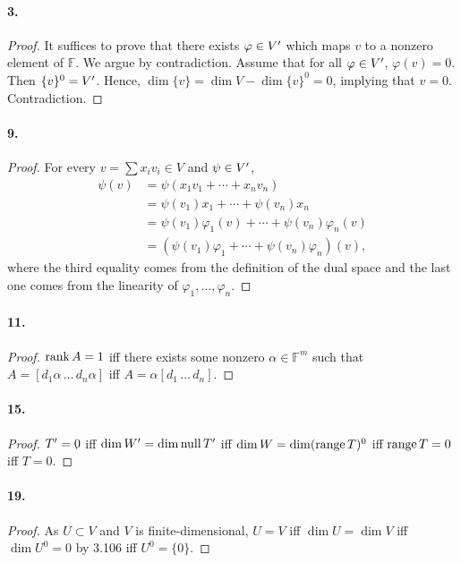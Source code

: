   \paragraph{3.}
  \begin{proof}
    It suffices to prove that there exists $\varphi\in V^\prime$ which maps $v$ to
    a nonzero element of $\mathbb{F}$. We argue by contradiction. Assume that
    for all $\varphi\in V^\prime$, $\varphi(v)=0$. Then $\{v\}^0 = V^\prime$. Hence, 
    $\dim \{v\} = \dim V-\dim \{v\}^0 = 0$, implying that $v=0$. Contradiction.
  \end{proof}

  \paragraph{9.}
  \begin{proof}
    For every $v=\sum x_iv_i \in V$ and $\psi\in V^\prime$,
    \begin{align*}
      \psi(v) 
      &= \psi(x_1v_1+\cdots+ x_nv_n) \\
      &= \psi(v_1)x_1 + \cdots + \psi(v_n)x_n \\
      &= \psi(v_1)\varphi_1(v) + \cdots + \psi(v_n)\varphi_n(v) \\
      &= (\psi(v_1)\varphi_1 + \cdots + \psi(v_n)\varphi_n)(v),
    \end{align*}
    where the third equality comes from the definition of the dual space and the
    last one comes from the linearity of $\varphi_1,\dots,\varphi_n$.
  \end{proof}

  \paragraph{11.}
  \begin{proof}
    $\operatorname{rank} A = 1$ iff there exists some nonzero $\alpha\in\mathbb{F}^m$ such 
    that $A = [d_1\alpha\,\dots\, d_n\alpha]$ iff $A = \alpha [d_1\, \dots \,
    d_n]$.
  \end{proof}

  \paragraph{15.}
  \begin{proof}
    $T^\prime=0$ iff $\dim W^\prime = \dim\operatorname{null} T^\prime$ iff $\dim W = \dim(\operatorname{range} T)^0$ iff
    $\operatorname{range} T = 0$ iff $T=0$.
  \end{proof}

  \paragraph{19.}
  \begin{proof}
    As $U\subset V$ and $V$ is finite-dimensional, $U=V$ iff $\dim U=\dim V$ iff
    $\dim U^0 = 0$ by 3.106 iff $U^0 = \{0\}$.
  \end{proof}

